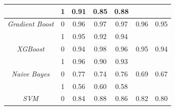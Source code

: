 \documentclass[conference]{IEEEtran} %
\begin{document}
\begin{table}[H]
{\begin{tabular}{|c|c|c|c|c|c|c|}
                                              & 1                                        & 0.91                                         & 0.85                                      & 0.88                                        &                                                 &                         \\ \hline
\multirow{}{}{\textit{Gradient Boost}}      & 0                                        & 0.96                                         & 0.97                                      & 0.97                                        & \multirow{}{}{0.96}                           & \multirow{}{}{0.95}   \\
                                              & 1                                        & 0.95                                         & 0.92                                      & 0.94                                        &                                                 &                         \\ \hline
\multirow{}{}{\textit{XGBoost}}             & 0                                        & 0.94                                         & 0.98                                      & 0.96                                        & \multirow{}{}{0.95}                           & \multirow{}{}{0.94}   \\
                                              & 1                                        & 0.96                                         & 0.90                                      & 0.93                                        &                                                 &                         \\ \hline
\multirow{}{}{\textit{Naive Bayes}}         & 0                                        & 0.77                                         & 0.74                                      & 0.76                                        & \multirow{}{}{0.69}                           & \multirow{}{}{0.67}   \\
                                              & 1                                        & 0.56                                         & 0.60                                      & 0.58                                        &                                                 &                         \\ \hline
\multirow{}{}{\textit{SVM}}                 & 0                                        & 0.84                                         & 0.88                                      & 0.86                                        & \multirow{}{}{0.82}                           & \multirow{}{}{0.80}   \\

\end{tabular}}
\end{table}
\end{document}
